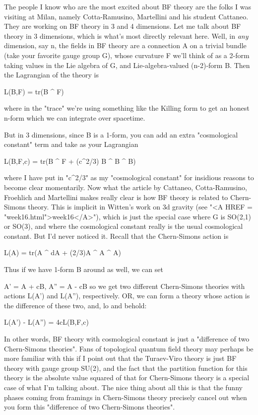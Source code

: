 The people I know who are the most excited about BF theory are
the folks I was visiting at Milan, namely Cotta-Ramusino, Martellini
and his student Cattaneo.  They are working on BF theory in 3 and
4 dimensions.  Let me talk about BF theory in 3 dimensions, which is what's
most directly relevant here.  Well, in \emph{any} dimension, say n, the fields
in BF theory are a connection A on a trivial bundle (take your favorite 
gauge group G), whose curvature F we'll think of as a 2-form taking 
values in the Lie algebra of G, and Lie-algebra-valued (n-2)-form B.  
Then the Lagrangian of the theory is

L(B,F) = tr(B ^ F)

where in the "trace" we're using something like the Killing form
to get an honest n-form which we can integrate over spacetime.

But in 3 dimensions, since B is a 1-form, you can add an extra
"cosmological constant" term and take as your Lagrangian

L(B,F,c) = tr(B ^ F + (c^{2}/3) B ^ B ^ B)

where I have put in "c^{2}/3"
as my "cosmological constant" for
insidious reasons to become clear momentarily.  
Now what the article by Cattaneo, Cotta-Ramusino, Froehlich
and Martellini makes really clear is how BF theory is related
to Chern-Simons theory.  This is implicit in Witten's work on 
3d gravity (see "<A HREF = "week16.html">week16</A>"), which is just the special case where G 
is SO(2,1) or SO(3), and where the cosmological constant really 
is the usual cosmological constant.  But I'd never noticed it.  
Recall that the Chern-Simons action is 

L(A) = tr(A ^ dA + (2/3)A ^ A ^ A)

Thus if we have 1-form B around as well, we can set

A' = A + cB,    A'' = A - cB
so we get two different Chern-Simons theories with
actions L(A') and L(A''), respectively. OR, we can form
a theory whose action is the difference of these two, and, lo
and behold:

L(A') - L(A'') =  4cL(B,F,c)

In other words, BF theory with cosmological constant is
just a "difference of two Chern-Simons theories".  Fans of
topological quantum field theory may perhaps be more familiar
with this if I point out that the Turaev-Viro theory is just BF theory
with gauge group SU(2), and the fact that the partition function for 
this theory is the absolute value squared of that for Chern-Simons 
theory is a special case of what I'm talking about.  The nice thing
about all this is that the funny phases coming from framings in 
Chern-Simons theory precisely cancel out when you form this
"difference of two Chern-Simons theories".

